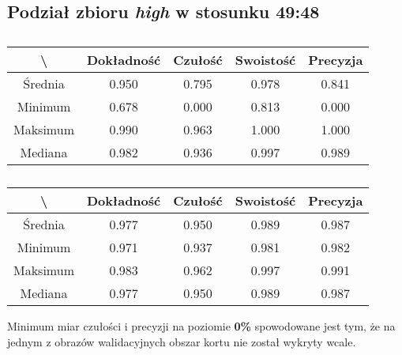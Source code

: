 \subsection{Podział zbioru \textit{high} w stosunku 49:48}


\begin{table}[H]
	\centering
	\caption{}
	\vspace{6pt}
	{\footnotesize
		\begin{tabular}{|c|c|c|c|c|}
      \hline \textbackslash & Dokładność & Czułość & Swoistość & Precyzja \\
      \hline Średnia & 0.950 & 0.795 & 0.978 & 0.841 \\
      \hline Minimum & 0.678 & 0.000 & 0.813 & 0.000 \\
      \hline Maksimum & 0.990 & 0.963 & 1.000 & 1.000 \\
      \hline Mediana & 0.982 & 0.936 & 0.997 & 0.989 \\
      \hline
    \end{tabular}
    \label{Tab:highsplitd_val}
	}
	\vspace{0pt}
\end{table}

\begin{table}[H]
	\centering
	\caption{}
	\vspace{6pt}
	{\footnotesize
		\begin{tabular}{|c|c|c|c|c|}
      \hline \textbackslash & Dokładność & Czułość & Swoistość & Precyzja \\
      \hline Średnia & 0.977 & 0.950 & 0.989 & 0.987 \\
      \hline Minimum & 0.971 & 0.937 & 0.981 & 0.982 \\
      \hline Maksimum & 0.983 & 0.962 & 0.997 & 0.991 \\
      \hline Mediana & 0.977 & 0.950 & 0.989 & 0.987 \\
      \hline
    \end{tabular}
    \label{Tab:highsplitd_test}
	}
	\vspace{0pt}
\end{table}

Minimum miar czułości i precyzji na poziomie \textbf{0\%} spowodowane jest tym, że na jednym z obrazów walidacyjnych obszar kortu nie został wykryty wcale.
